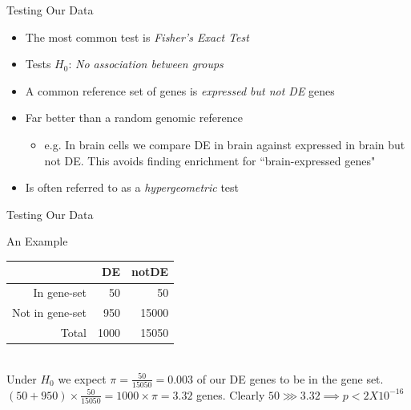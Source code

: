 \documentclass[aspectratio=169,11pt]{beamer}
\begin{document}
\begin{frame}{Testing Our Data}

	\begin{itemize}
		\item The most common test is \textit{Fisher's Exact Test}
		\item Tests $H_0$: \textit{No association between groups}
		\item A common reference set of genes is \textit{expressed but not DE} genes
		\item Far better than a random genomic reference
		\begin{itemize}
			\item e.g. In brain cells we compare DE in brain against expressed in brain but not DE.
			This avoids finding enrichment for ``brain-expressed genes"
		\end{itemize}
		\item Is often referred to as a \textit{hypergeometric} test
	\end{itemize}
	
\end{frame}

\begin{frame}{Testing Our Data}

An Example

	\begin{center}
		\begin{tabular}{r|rr}
			& DE & notDE \\
			\toprule
		In gene-set & 50 & 50 \\
		Not in gene-set & 950 & 15000 \\
		\midrule
		Total & 1000 & 15050 \\
		\bottomrule
		\end{tabular}
	\end{center}
	~\\[2mm]
	Under $H_0$ we expect $\pi = \frac{50}{15050} = 0.003$ of our DE genes to be in the gene set.\\[3mm]
	$(50 + 950)\times\frac{50}{15050} = 1000\times\pi = 3.32$ genes. Clearly $50 \ggg 3.32 \implies p < 2X10^{-16}$

\end{frame}
\end{document}
